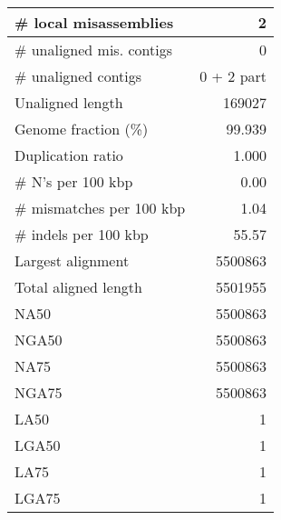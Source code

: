\documentclass[12pt,a4paper]{article}
\begin{document}
\begin{table}[ht]
\begin{center}
\begin{tabular}{|l*{1}{|r}|}
\# local misassemblies & 2 \\ \hline
\# unaligned mis. contigs & 0 \\ \hline
\# unaligned contigs & 0 + 2 part \\ \hline
Unaligned length & 169027 \\ \hline
Genome fraction (\%) & 99.939 \\ \hline
Duplication ratio & 1.000 \\ \hline
\# N's per 100 kbp & 0.00 \\ \hline
\# mismatches per 100 kbp & 1.04 \\ \hline
\# indels per 100 kbp & 55.57 \\ \hline
Largest alignment & 5500863 \\ \hline
Total aligned length & 5501955 \\ \hline
NA50 & 5500863 \\ \hline
NGA50 & 5500863 \\ \hline
NA75 & 5500863 \\ \hline
NGA75 & 5500863 \\ \hline
LA50 & 1 \\ \hline
LGA50 & 1 \\ \hline
LA75 & 1 \\ \hline
LGA75 & 1 \\ \hline
\end{tabular}
\end{center}
\end{table}
\end{document}
